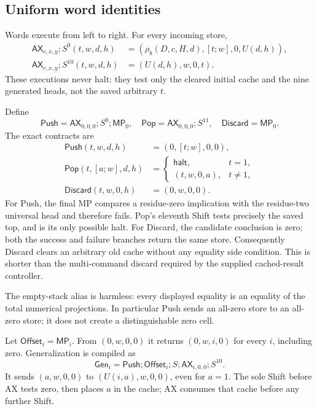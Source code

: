 \subsection{Uniform word identities}

Words execute from left to right.  For every incoming store,
\begin{align*}
 \mathsf{AX}_{c,x,y};S^9(t,w,d,h)
   &=(\rho_8(D,c,H,d),[t;w],0,U(d,h)),\\
 \mathsf{AX}_{c,x,y};S^{10}(t,w,d,h)
   &=(U(d,h),w,0,t).
\end{align*}
These executions never halt: they test only the cleared initial cache and
the nine generated heads, not the saved arbitrary $t$.

Define
\[
 \mathsf{Push}=\mathsf{AX}_{0,0,0};S^9;\mathsf{MP}_0,
 \quad \mathsf{Pop}=\mathsf{AX}_{0,0,0};S^{11},
 \quad \mathsf{Discard}=\mathsf{MP}_0.
\]
The exact contracts are
\begin{align*}
 \mathsf{Push}(t,w,d,h)&=(0,[t;w],0,0),\\
 \mathsf{Pop}(t,[a;w],d,h)&=
   \begin{cases}\mathsf{halt},&t=1,\\(t,w,0,a),&t\ne1,
   \end{cases}\\
 \mathsf{Discard}(t,w,0,h)&=(0,w,0,0).
\end{align*}
For Push, the final MP compares a residue-zero implication with the
residue-two universal head and therefore fails.  Pop's eleventh Shift
tests precisely the saved top, and is its only possible halt.  For
Discard, the candidate conclusion is zero; both the success and failure
branches return the same store.  Consequently Discard clears an arbitrary
old cache without any equality side condition.  This is shorter than the
multi-command discard required by the supplied cached-result controller.

The empty-stack alias is harmless: every displayed equality is an equality
of the total numerical projections.  In particular Push sends an all-zero
store to an all-zero store; it does not create a distinguishable zero cell.

Let $\mathsf{Offset}_i=\mathsf{MP}_i$.  From $(0,w,0,0)$ it returns
$(0,w,i,0)$ for every $i$, including zero.  Generalization is compiled as
\[
 \mathsf{Gen}_i=
 \mathsf{Push};\mathsf{Offset}_i;S;\mathsf{AX}_{i,0,0};S^{10}.
\]
It sends $(a,w,0,0)$ to $(U(i,a),w,0,0)$, even for $a=1$.
The sole Shift before AX tests zero, then places $a$ in the cache; AX
consumes that cache before any further Shift.

